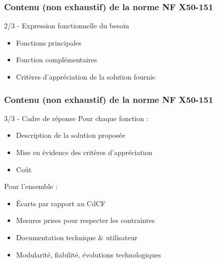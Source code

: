 \begin{frame}
\frametitle{Contenu (non exhaustif) de la norme NF X50-151}
\begin{block}{2/3 - Expression fonctionnelle du besoin}
\begin{itemize}
    \item Fonctions principales %
    \item Fonction complémentaires %
    \item Critères d'appréciation de la solution fournie %
\end{itemize}
\end{block}

\end{frame}

\begin{frame}
\frametitle{Contenu (non exhaustif) de la norme NF X50-151}

\begin{block}{3/3 - Cadre de réponse}
Pour chaque fonction :
\begin{itemize}
    \item Description de la solution proposée %
    \item Mise en évidence des critères d'appréciation %
    \item Coût %
\end{itemize}
Pour l'ensemble :
\begin{itemize}
    \item Écarts par rapport au CdCF %
    \item Mesures prises pour respecter les contraintes %
    \item Documentation technique \& utilisateur %
    \item Modularité, fiabilité, évolutions technologiques %
\end{itemize}
\end{block}

\end{frame} %

